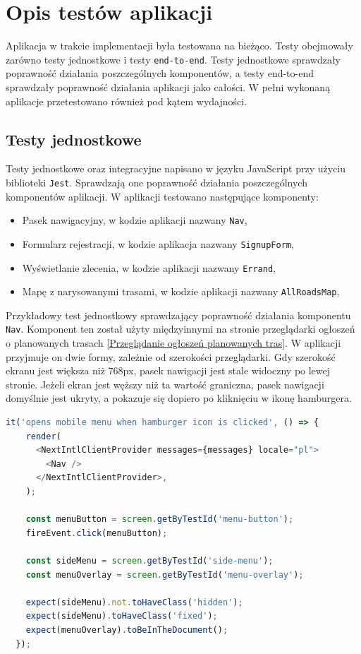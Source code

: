 \section{Opis testów aplikacji}
Aplikacja w trakcie implementacji była testowana na bieżąco. Testy obejmowały zarówno testy jednostkowe i testy \texttt{end-to-end}. Testy jednostkowe sprawdzały poprawność działania poszczególnych komponentów, a testy end-to-end sprawdzały poprawność działania aplikacji jako całości. W pełni wykonaną aplikacje przetestowano również pod kątem wydajności.

\subsection{Testy jednostkowe}
Testy jednostkowe oraz integracyjne napisano w języku JavaScript przy użyciu biblioteki \texttt{Jest}. Sprawdzają one poprawność działania poszczególnych komponentów aplikacji. W aplikacji testowano następujące komponenty:
\begin{itemize}
  \item Pasek nawigacyjny, w kodzie aplikacji nazwany \texttt{Nav},
  \item Formularz rejestracji, w kodzie aplikacja nazwany \texttt{SignupForm},
  \item Wyświetlanie zlecenia, w kodzie aplikacji nazwany \texttt{Errand},
  \item Mapę z narysowanymi trasami, w kodzie aplikacji nazwany \texttt{AllRoadsMap},
\end{itemize}

Przykładowy test jednostkowy sprawdzający poprawność działania komponentu \texttt{Nav}. Komponent ten został użyty międzyinnymi na stronie przeglądarki ogłoszeń o planowanych trasach \ref{Przeglądanie ogłoszeń planowanych tras}. W aplikacji przyjmuje on dwie formy, zależnie od szerokości przeglądarki. Gdy szerokość ekranu jest większa niż 768px, pasek nawigacji jest stale widoczny po lewej stronie. Jeżeli ekran jest węższy niż ta wartość graniczna, pasek nawigacji domyślnie jest ukryty, a pokazuje się dopiero po kliknięciu w ikonę hamburgera.

\pagebreak
{\belowcaptionskip=-9pt
\begin{lstlisting}[language=JavaScript,caption=Przykładowy test jednostkowy paska nawigacyjnego, label=lst:NavTest]
it('opens mobile menu when hamburger icon is clicked', () => {
    render(
      <NextIntlClientProvider messages={messages} locale="pl">
        <Nav />
      </NextIntlClientProvider>,
    );

    const menuButton = screen.getByTestId('menu-button');
    fireEvent.click(menuButton);

    const sideMenu = screen.getByTestId('side-menu');
    const menuOverlay = screen.getByTestId('menu-overlay');

    expect(sideMenu).not.toHaveClass('hidden');
    expect(sideMenu).toHaveClass('fixed');
    expect(menuOverlay).toBeInTheDocument();
  });
\end{lstlisting}
}

